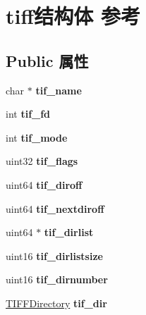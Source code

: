 \hypertarget{structtiff}{}\section{tiff结构体 参考}
\label{structtiff}
\subsection*{Public 属性}
\begin{DoxyCompactItemize}
\item 
\mbox{\label{structtiff_a6f3ae2e2468f2e568a713de6fe68d0c7}} 
char $\ast$ {\bfseries tif\+\_\+name}
\item 
\mbox{\label{structtiff_ab1b0f79327eb41e871708846f9fbcf7b}} 
int {\bfseries tif\+\_\+fd}
\item 
\mbox{\label{structtiff_aed8a99f194e71d26c3d1bfd491e1bc28}} 
int {\bfseries tif\+\_\+mode}
\item 
\mbox{\label{structtiff_a73ef7bb5bdd7938e176e2444bfcb8060}} 
uint32 {\bfseries tif\+\_\+flags}
\item 
\mbox{\label{structtiff_ac6433d7ae67e4fb99034a6a8ef80e12f}} 
uint64 {\bfseries tif\+\_\+diroff}
\item 
\mbox{\label{structtiff_a9b7474571265890dfc9a4d78f981357f}} 
uint64 {\bfseries tif\+\_\+nextdiroff}
\item 
\mbox{\label{structtiff_a047652708f45314dae096c95dc612f44}} 
uint64 $\ast$ {\bfseries tif\+\_\+dirlist}
\item 
\mbox{\label{structtiff_afa2aa4267133a1134c16549385769a88}} 
uint16 {\bfseries tif\+\_\+dirlistsize}
\item 
\mbox{\label{structtiff_a0f646e393cedf4fbf99b43e6d08f8603}} 
uint16 {\bfseries tif\+\_\+dirnumber}
\item 
\mbox{\label{structtiff_a842fae55fa77b28f44f1c1e796e78c54}} 
\hyperlink{struct_t_i_f_f_directory}{T\+I\+F\+F\+Directory} {\bfseries tif\+\_\+dir}
\item 

\end{DoxyCompactItemize}
